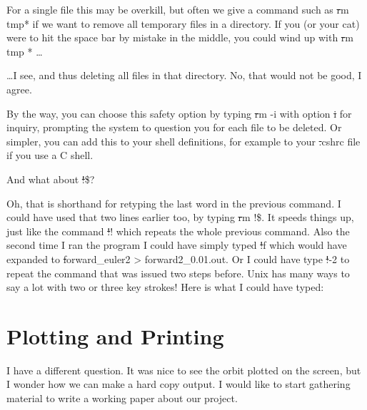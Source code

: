 \carol
For a single file this may be overkill, but often we give a command
such as {\st rm tmp*} if we want to remove all temporary files in a
directory.  If you (or your cat) were to hit the space bar by mistake
in the middle, you could wind up with {\st rm tmp *} \dots

\bob
\dots I see, and thus deleting all files in that directory.  No, that
would not be good, I agree.

\carol
By the way, you can choose this safety option by typing {\st rm -i}
with option {\st i} for inquiry, prompting the system to question you
for each file to be deleted.  Or simpler, you can add this to your
shell definitions, for example to your {\st .cshrc} file if you use a
C shell.

\bob
And what about {\st !\$}?

\carol
Oh, that is shorthand for retyping the last word in the previous command.
I could have used that two lines earlier too, by typing {\st rm !\$}.
It speeds things up, just like the command {\st !!} which repeats the
whole previous command.  Also the second time I ran the program I
could have simply typed {\st !f} which would have expanded to
{\st forward\_euler2 > forward2\_0.01.out}.  Or I could have type {\st !-2}
to repeat the command that was issued two steps before.  Unix has many
ways to say a lot with two or three key strokes!  Here is what I could
have typed:

\cba


\section{Plotting and Printing}

\abc

\alice
I have a different question.
It was nice to see the orbit plotted on the screen, but I wonder how
we can make a hard copy output.  I would like to start gathering
material to write a working paper about our project.

